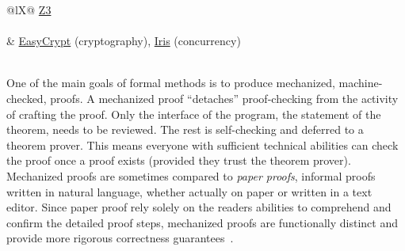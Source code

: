 \begin{table}[p!]
\begin{tabularx}{\linewidth}{@{}lX@{}}
{    \href{https://github.com/Z3Prover/z3}{Z3}}
\\
\midrule
{} \\
&
    \href{https://github.com/EasyCrypt/easycrypt}{EasyCrypt} (cryptography),
    \href{https://iris-project.org/}{Iris} (concurrency)
\\
\midrule
{}
\\
\bottomrule
\caption[Tools for formal methods]{%
A collection of formal methods tools.
The categorization is somewhat rough because some tools fit multiple categories.
The list is a limited sample, but with more prominent tools to improve its usefulness.}
\label{tab:fm-tools}
\end{tabularx}
\end{table}

One of the main goals of formal methods is to produce mechanized, \ie machine-checked, proofs.
A mechanized proof \enquote{detaches} proof-checking from the activity of crafting the proof.
Only the interface of the program, \ie the statement of the theorem, needs to be reviewed.
The rest is self-checking and deferred to a theorem prover.
This means everyone with sufficient technical abilities can check the proof once a proof exists (provided they trust the theorem prover).
Mechanized proofs are sometimes compared to \emph{paper proofs}, \ie informal proofs written in natural language, whether actually on paper or written in a text editor.
Since paper proof rely solely on the readers abilities to comprehend and confirm the detailed proof steps, mechanized proofs are functionally distinct and provide more rigorous correctness guarantees~\cite{gonthier2008}.

